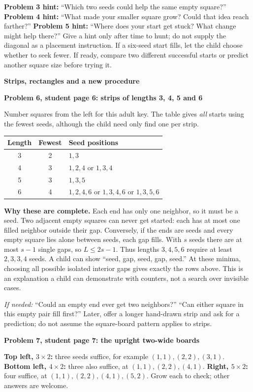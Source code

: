 \documentclass[11pt]{article}
\newcommand{\head}[1]{\par\textbf{\large #1}\par}
\newcommand{\sub}[1]{\par\textbf{#1}\par}
\newcommand{\hint}[1]{\textit{If needed:} #1}
\begin{document}
\textbf{Problem 3 hint:} ``Which two seeds could help the same empty square?'' \textbf{Problem 4 hint:} ``What made your smaller square grow? Could that idea reach farther?'' \textbf{Problem 5 hint:} ``Where does your start get stuck? What change might help there?'' Give a hint only after time to hunt; do not supply the diagonal as a placement instruction. If a six-seed start fills, let the child choose whether to seek fewer. If ready, compare two different successful starts or predict another square size before trying it.

\newpage
\head{Strips, rectangles and a new procedure}
\sub{Problem 6, student page 6: strips of lengths 3, 4, 5 and 6}
Number squares from the left for this adult key. The table gives \emph{all} starts using the fewest seeds, although the child need only find one per strip.
\begin{center}\renewcommand{\arraystretch}{1.15}
\begin{tabular}{c c l}
Length & Fewest & Seed positions\\\midrule
3 & 2 & $1,3$\\
4 & 3 & $1,2,4$ or $1,3,4$\\
5 & 3 & $1,3,5$\\
6 & 4 & $1,2,4,6$ or $1,3,4,6$ or $1,3,5,6$
\end{tabular}\end{center}
\textbf{Why these are complete.} Each end has only one neighbor, so it must be a seed. Two adjacent empty squares can never get started: each has at most one filled neighbor outside their gap. Conversely, if the ends are seeds and every empty square lies alone between seeds, each gap fills. With $s$ seeds there are at most $s-1$ single gaps, so $L\le2s-1$. Thus lengths $3,4,5,6$ require at least $2,3,3,4$ seeds. A child can show ``seed, gap, seed, gap, seed.'' At these minima, choosing all possible isolated interior gaps gives exactly the rows above. This is an explanation a child can demonstrate with counters, not a search over invisible cases.

\hint{``Could an empty end ever get two neighbors?'' ``Can either square in this empty pair fill first?''} Later, offer a longer hand-drawn strip and ask for a prediction; do not assume the square-board pattern applies to strips.

\sub{Problem 7, student page 7: the upright two-wide boards}
\textbf{Top left, $3\times2$:} three seeds suffice, for example $(1,1),(2,2),(3,1)$. \textbf{Bottom left, $4\times2$:} three also suffice, at $(1,1),(2,2),(4,1)$. \textbf{Right, $5\times2$:} four suffice, at $(1,1),(2,2),(4,1),(5,2)$. Grow each to check; other answers are welcome.
\end{document}
